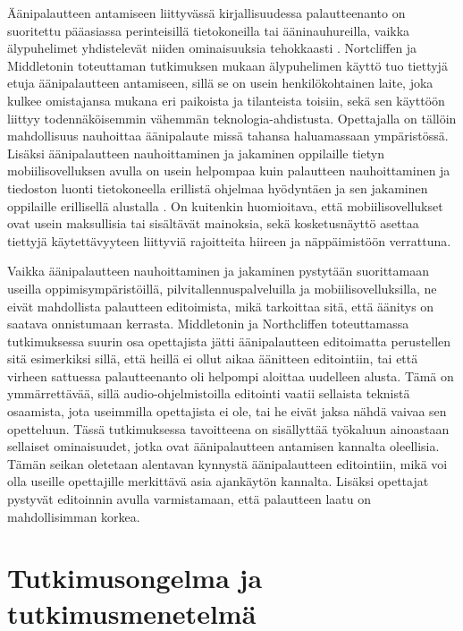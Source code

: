 \documentclass[utf8]{gradu3}
\begin{document}
Äänipalautteen antamiseen liittyvässä kirjallisuudessa palautteenanto on suoritettu pääasiassa perinteisillä tietokoneilla tai ääninauhureilla, vaikka älypuhelimet yhdistelevät niiden ominaisuuksia tehokkaasti \parencite{smartphone}. Nortcliffen ja Middletonin \parencite*{smartphone} toteuttaman tutkimuksen mukaan älypuhelimen käyttö tuo tiettyjä etuja äänipalautteen antamiseen, sillä se on usein henkilökohtainen laite, joka kulkee omistajansa mukana eri paikoista ja tilanteista toisiin, sekä sen käyttöön liittyy todennäköisemmin vähemmän teknologia-ahdistusta. Opettajalla on tällöin mahdollisuus nauhoittaa äänipalaute missä tahansa haluamassaan ympäristössä. Lisäksi äänipalautteen nauhoittaminen ja jakaminen oppilaille tietyn mobiilisovelluksen avulla on usein helpompaa kuin palautteen nauhoittaminen ja tiedoston luonti tietokoneella erillistä ohjelmaa hyödyntäen ja sen jakaminen oppilaille erillisellä alustalla \parencite{smartphone}. On kuitenkin huomioitava, että mobiilisovellukset ovat usein maksullisia tai sisältävät mainoksia, sekä kosketusnäyttö asettaa tiettyjä käytettävyyteen liittyviä rajoitteita hiireen ja näppäimistöön verrattuna. 

Vaikka äänipalautteen nauhoittaminen ja jakaminen pystytään suorittamaan useilla oppimisympäristöillä, pilvitallennuspalveluilla ja mobiilisovelluksilla, ne eivät mahdollista palautteen editoimista, mikä tarkoittaa sitä, että äänitys on saatava onnistumaan kerrasta. Middletonin ja Northcliffen \parencite*{principles} toteuttamassa tutkimuksessa suurin osa opettajista jätti äänipalautteen editoimatta perustellen sitä esimerkiksi sillä, että heillä ei ollut aikaa äänitteen editointiin, tai että virheen sattuessa palautteenanto oli helpompi aloittaa uudelleen alusta. Tämä on ymmärrettävää, sillä audio-ohjelmistoilla editointi  vaatii sellaista teknistä osaamista, jota useimmilla opettajista ei ole, tai he eivät jaksa nähdä vaivaa sen opetteluun. Tässä tutkimuksessa tavoitteena on sisällyttää työkaluun ainoastaan sellaiset ominaisuudet, jotka ovat äänipalautteen antamisen kannalta oleellisia. Tämän seikan oletetaan alentavan kynnystä äänipalautteen editointiin, mikä voi olla useille opettajille merkittävä asia ajankäytön kannalta. Lisäksi opettajat pystyvät editoinnin avulla varmistamaan, että palautteen laatu on mahdollisimman korkea.

%

\chapter{Tutkimusongelma ja tutkimusmenetelmä}
\end{document}
